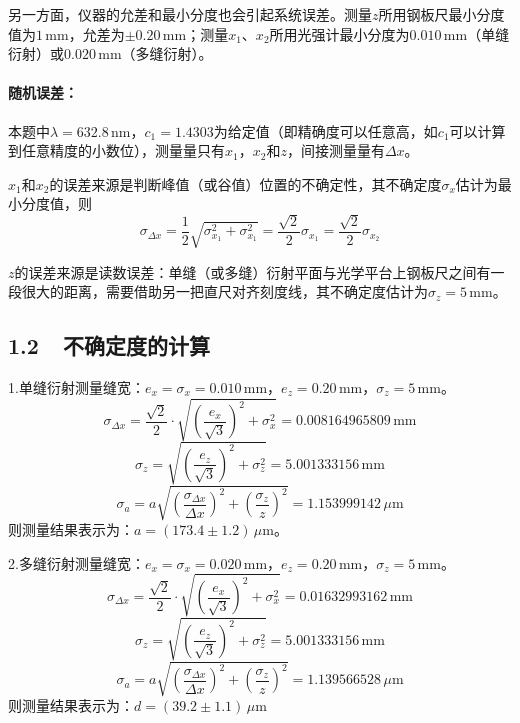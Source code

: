 \documentclass[a4paper,fontset=windows]{ctexbook}
\begin{document}
    \qquad 另一方面，仪器的允差和最小分度也会引起系统误差。测量$z$所用钢板尺最小分度值为$1\,\mathrm{mm}$，允差为$\pm0.20\,\mathrm{mm}$；测量$x_1$、$x_2$所用光强计最小分度为$0.010\,\mathrm{mm}$（单缝衍射）或$0.020\,\mathrm{mm}$（多缝衍射）。

    \paragraph{ 随机误差：\hspace{-1em}}本题中$\lambda=632.8\,\mathrm{nm}$，$c_1=1.4303$为给定值（即精确度可以任意高，如$c_1$可以计算到任意精度的小数位），测量量只有$x_1$，$x_2$和$z$，间接测量量有$\Delta x$。

    \qquad $x_1$和$x_2$的误差来源是判断峰值（或谷值）位置的不确定性，其不确定度$\sigma_x$估计为最小分度值，则
    \[
    \sigma_{\Delta x} = \frac{1}{2}\sqrt{\sigma_{x_1}^2 + \sigma_{x_1}^2} = \frac{\sqrt{2}}{2}\sigma_{x_1} = \frac{\sqrt{2}}{2}\sigma_{x_2}
    \]

    \qquad $z$的误差来源是读数误差：单缝（或多缝）衍射平面与光学平台上钢板尺之间有一段很大的距离，需要借助另一把直尺对齐刻度线，其不确定度估计为$\sigma_z=5\,\mathrm{mm}$。

    \subsection*{ 1.2\ \ 不确定度的计算}

    1.单缝衍射测量缝宽：$e_x = \sigma_x = 0.010\,\mathrm{mm}$，$e_z = 0.20\,\mathrm{mm}$，$\sigma_z=5\,\mathrm{mm}$。
    \[
    \sigma_{\Delta x} = \frac{\sqrt{2}}{2}\cdot\sqrt{\left(\frac{e_x}{\sqrt{3}}\right)^2 + \sigma_{x}^2} = 0.008164965809\,\mathrm{mm}
    \]
    \[
    \sigma_z = \sqrt{\left(\frac{e_z}{\sqrt{3}}\right)^2 + \sigma_{z}^2} = 5.001333156\,\mathrm{mm}
    \]
    \[
    \sigma_a = a\sqrt{\left(\frac{\sigma_{\Delta x}}{\Delta x}\right)^2 + \left(\frac{\sigma_z}{z}\right)^2} = 1.153999142\,\mu\mathrm{m}
    \]
    则测量结果表示为：$a = (173.4\pm1.2)\,\mu\mathrm{m}$。

    \bigskip
    2.多缝衍射测量缝宽：$e_x = \sigma_x = 0.020\,\mathrm{mm}$，$e_z = 0.20\,\mathrm{mm}$，$\sigma_z=5\,\mathrm{mm}$。
    \[
    \sigma_{\Delta x} = \frac{\sqrt{2}}{2}\cdot\sqrt{\left(\frac{e_x}{\sqrt{3}}\right)^2 + \sigma_{x}^2} = 0.01632993162\,\mathrm{mm}
    \]
    \[
    \sigma_z = \sqrt{\left(\frac{e_z}{\sqrt{3}}\right)^2 + \sigma_{z}^2} = 5.001333156\,\mathrm{mm}
    \]
    \[
    \sigma_a = a\sqrt{\left(\frac{\sigma_{\Delta x}}{\Delta x}\right)^2 + \left(\frac{\sigma_z}{z}\right)^2} = 1.139566528\,\mu\mathrm{m}
    \]
    则测量结果表示为：$d = (39.2\pm1.1)\,\mu\mathrm{m}$
\end{document}
